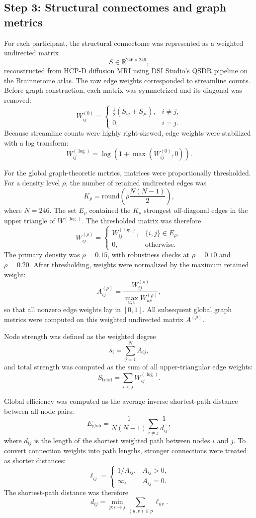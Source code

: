 \documentclass[11pt]{article}
\begin{document}
\subsection{Step 3: Structural connectomes and graph metrics}

For each participant, the structural connectome was represented as a weighted undirected matrix
\[
S \in \mathbb{R}^{246 \times 246},
\]
reconstructed from HCP-D diffusion MRI using DSI Studio's QSDR pipeline on the Brainnetome atlas. The raw edge weights corresponded to streamline counts. Before graph construction, each matrix was symmetrized and its diagonal was removed:
\[
W^{(0)}_{ij} =
\begin{cases}
\frac{1}{2}\left(S_{ij}+S_{ji}\right), & i \neq j,\\
0, & i=j.
\end{cases}
\]
Because streamline counts were highly right-skewed, edge weights were stabilized with a log transform:
\[
W^{(\log)}_{ij}
=
\log\left(1+\max\left(W^{(0)}_{ij},0\right)\right).
\]

For the global graph-theoretic metrics, matrices were proportionally thresholded. For a density level $\rho$, the number of retained undirected edges was
\[
K_{\rho}
=
\mathrm{round}\left(
\rho \frac{N(N-1)}{2}
\right),
\]
where $N=246$. The set $E_{\rho}$ contained the $K_{\rho}$ strongest off-diagonal edges in the upper triangle of $W^{(\log)}$. The thresholded matrix was therefore
\[
W^{(\rho)}_{ij} =
\begin{cases}
W^{(\log)}_{ij}, & \{i,j\}\in E_{\rho},\\
0, & \text{otherwise}.
\end{cases}
\]
The primary density was $\rho=0.15$, with robustness checks at $\rho=0.10$ and $\rho=0.20$. After thresholding, weights were normalized by the maximum retained weight:
\[
A^{(\rho)}_{ij}
=
\frac{W^{(\rho)}_{ij}}
{\max_{u,v} W^{(\rho)}_{uv}},
\]
so that all nonzero edge weights lay in $[0,1]$. All subsequent global graph metrics were computed on this weighted undirected matrix $A^{(\rho)}$.

Node strength was defined as the weighted degree
\[
s_i
=
\sum_{j=1}^{N} A_{ij},
\]
and total strength was computed as the sum of all upper-triangular edge weights:
\[
S_{\mathrm{total}}
=
\sum_{i<j} W^{(\log)}_{ij}.
\]

Global efficiency was computed as the average inverse shortest-path distance between all node pairs:
\[
E_{\mathrm{glob}}
=
\frac{1}{N(N-1)}
\sum_{i\neq j}
\frac{1}{d_{ij}},
\]
where $d_{ij}$ is the length of the shortest weighted path between nodes $i$ and $j$. To convert connection weights into path lengths, stronger connections were treated as shorter distances:
\[
\ell_{ij}
=
\begin{cases}
1/A_{ij}, & A_{ij}>0,\\
\infty, & A_{ij}=0.
\end{cases}
\]
The shortest-path distance was therefore
\[
d_{ij}
=
\min_{p:i\rightarrow j}
\sum_{(u,v)\in p}
\ell_{uv}.
\]
\end{document}
